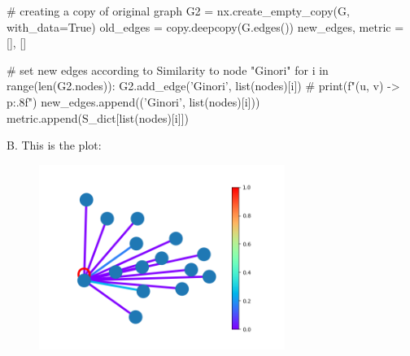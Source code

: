 \documentclass[11pt]{article}
\begin{document}
\begin{python}
# creating a copy of original graph 
G2 = nx.create_empty_copy(G, with_data=True)
old_edges = copy.deepcopy(G.edges())
new_edges, metric = [], []

# set new edges according to Similarity to node "Ginori"
for i in range(len(G2.nodes)):
    G2.add_edge('Ginori', list(nodes)[i])
    # print(f"({u}, {v}) -> {p:.8f}")
    new_edges.append(('Ginori', list(nodes)[i]))
    metric.append(S_dict[list(nodes)[i]])
\end{python}


B. This is the plot:

\begin{figure}[h]
\includegraphics[width=8cm]{Jaccard.png}
\end{figure}
\clearpage
\end{document}
